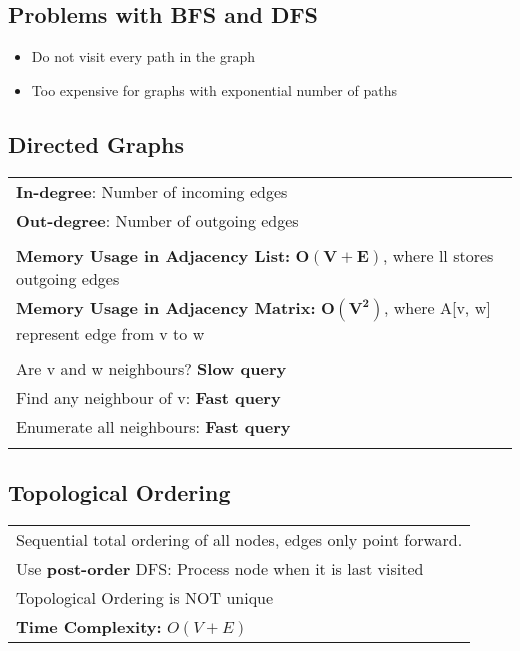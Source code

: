 \documentclass{article}
\begin{document}
    \subsection{Problems with BFS and DFS}

    \begin{itemize}
        \item Do not visit every path in the graph
        \item Too expensive for graphs with exponential number of paths
    \end{itemize}

    \pagebreak

    \subsection{Directed Graphs}

    \begin{tabular}{l}
        \textbf{In-degree}: Number of incoming edges\\
        \textbf{Out-degree}: Number of outgoing edges\\\\
        \textbf{Memory Usage in Adjacency List: }$\bm{O(V + E)}$, where ll stores outgoing edges\\
        \textbf{Memory Usage in Adjacency Matrix:} $\bm{O(V^{2})}$, where A[v, w] represent edge from v to w\\\\
        Are v and w neighbours? \textbf{Slow query}\\
        Find any neighbour of v: \textbf{Fast query}\\
        Enumerate all neighbours: \textbf{Fast query}\\\\
    \end{tabular}

    \subsection{Topological Ordering}

    \begin{tabular}{l}
        Sequential total ordering of all nodes, edges only point forward.\\
        Use \textbf{post-order} DFS: Process node when it is last visited\\
        Topological Ordering is NOT unique\\
        \textbf{Time Complexity: }$O(V+E)$\\
    \end{tabular}
\end{document}
